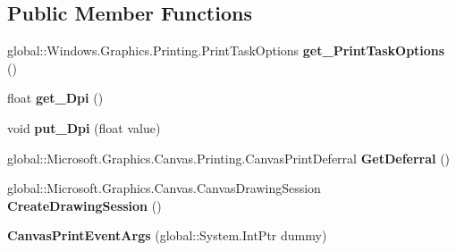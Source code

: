 \subsection*{Public Member Functions}
\begin{DoxyCompactItemize}
\item 
\mbox{\label{class_microsoft_1_1_graphics_1_1_canvas_1_1_printing_1_1_canvas_print_event_args_ad5b73bb8902c264570280b8d32de248a}} 
global\+::\+Windows.\+Graphics.\+Printing.\+Print\+Task\+Options {\bfseries get\+\_\+\+Print\+Task\+Options} ()
\item 
\mbox{\label{class_microsoft_1_1_graphics_1_1_canvas_1_1_printing_1_1_canvas_print_event_args_a489419324969512ed6bcc06da051d2b8}} 
float {\bfseries get\+\_\+\+Dpi} ()
\item 
\mbox{\label{class_microsoft_1_1_graphics_1_1_canvas_1_1_printing_1_1_canvas_print_event_args_a5f0f1ae61467f9da31d3133fae0a7413}} 
void {\bfseries put\+\_\+\+Dpi} (float value)
\item 
\mbox{\label{class_microsoft_1_1_graphics_1_1_canvas_1_1_printing_1_1_canvas_print_event_args_a2e052fa5533258995ffc08b251a211d5}} 
global\+::\+Microsoft.\+Graphics.\+Canvas.\+Printing.\+Canvas\+Print\+Deferral {\bfseries Get\+Deferral} ()
\item 
\mbox{\label{class_microsoft_1_1_graphics_1_1_canvas_1_1_printing_1_1_canvas_print_event_args_a02bc922ffbfd6f4208853d6a3a2f0f4e}} 
global\+::\+Microsoft.\+Graphics.\+Canvas.\+Canvas\+Drawing\+Session {\bfseries Create\+Drawing\+Session} ()
\item 
\mbox{\label{class_microsoft_1_1_graphics_1_1_canvas_1_1_printing_1_1_canvas_print_event_args_ab71de59113b5cb4d0d36f0a663ad75b5}} 
{\bfseries Canvas\+Print\+Event\+Args} (global\+::\+System.\+Int\+Ptr dummy)
\item 

\end{DoxyCompactItemize}
